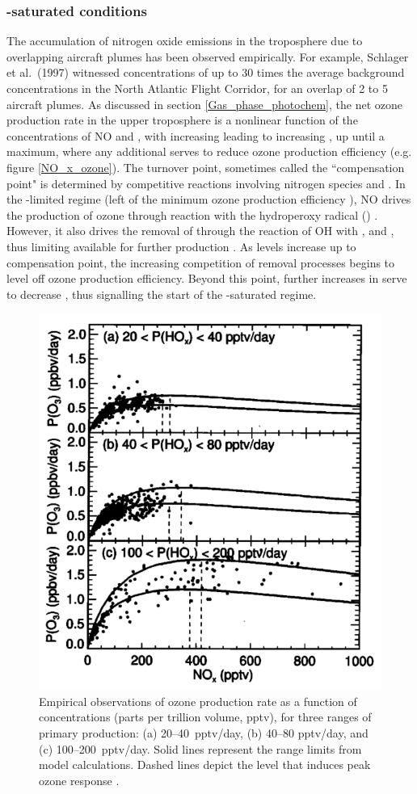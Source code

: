 \subsubsection{-saturated conditions}
The accumulation of nitrogen oxide emissions in the troposphere due to overlapping aircraft plumes has been observed empirically. For example, Schlager et al.\ (1997) \cite{Schlager1997} witnessed  concentrations of up to 30 times the average background concentrations in the North Atlantic Flight Corridor, for an overlap of 2 to 5 aircraft plumes. As discussed in section \ref{Gas_phase_photochem}, the net ozone production rate in the upper troposphere is a nonlinear function of the concentrations of NO and , with increasing  leading to increasing , up until a maximum, where any additional  serves to reduce ozone production efficiency (e.g. figure \ref{NO_x_ozone}). The turnover point, sometimes called the ``compensation point" is determined by competitive reactions involving nitrogen species and . In the -limited regime (left of the minimum ozone production efficiency ), NO drives the production of ozone through reaction with the hydroperoxy radical () \cite{Monks2005}. However, it also drives the removal of  through the reaction of OH with ,  and , thus limiting  available for further  production \cite{Wennberg1998}. As  levels increase up to compensation point, the increasing competition of  removal processes begins to level off ozone production efficiency. Beyond this point, further increases in  serve to decrease , thus signalling the start of the -saturated regime. 

\begin{figure}[H]
  \centering
  \includegraphics[width=0.5\linewidth]{Jaegle_sat.png}
  \caption{Empirical observations of ozone production rate as a function of  concentrations (parts per trillion volume, pptv), for three ranges of primary  production: (a) 20--40~pptv/day, (b) 40--80 pptv/day, and (c) 100--200~pptv/day. Solid lines represent the range limits from model calculations. Dashed lines depict the  level that induces peak ozone response \cite{Jaegle1999}.}
  \label{Jaegle_sat}
\end{figure}

